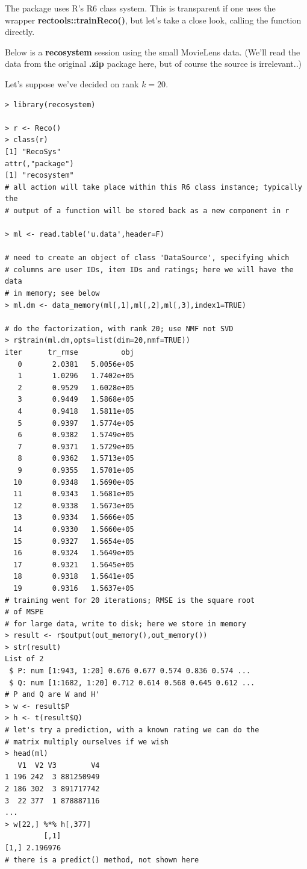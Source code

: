 The package uses R's R6 class system.  This is transparent if one uses
the wrapper \textbf{rectools::trainReco()}, but let's take a close look,
calling the function directly.


Below is a \textbf{recosystem} session using the small MovieLens data.
(We'll read the data from the original \textbf{.zip} package here, but
of course the source is irrelevant..)

Let's suppose we've decided on rank $k = 20$. 

\begin{lstlisting}
> library(recosystem)

> r <- Reco()
> class(r)
[1] "RecoSys"
attr(,"package")
[1] "recosystem"
# all action will take place within this R6 class instance; typically the 
# output of a function will be stored back as a new component in r

> ml <- read.table('u.data',header=F)

# need to create an object of class 'DataSource', specifying which
# columns are user IDs, item IDs and ratings; here we will have the data
# in memory; see below
> ml.dm <- data_memory(ml[,1],ml[,2],ml[,3],index1=TRUE)

# do the factorization, with rank 20; use NMF not SVD
> r$train(ml.dm,opts=list(dim=20,nmf=TRUE))
iter      tr_rmse          obj
   0       2.0381   5.0056e+05
   1       1.0296   1.7402e+05
   2       0.9529   1.6028e+05
   3       0.9449   1.5868e+05
   4       0.9418   1.5811e+05
   5       0.9397   1.5774e+05
   6       0.9382   1.5749e+05
   7       0.9371   1.5729e+05
   8       0.9362   1.5713e+05
   9       0.9355   1.5701e+05
  10       0.9348   1.5690e+05
  11       0.9343   1.5681e+05
  12       0.9338   1.5673e+05
  13       0.9334   1.5666e+05
  14       0.9330   1.5660e+05
  15       0.9327   1.5654e+05
  16       0.9324   1.5649e+05
  17       0.9321   1.5645e+05
  18       0.9318   1.5641e+05
  19       0.9316   1.5637e+05
# training went for 20 iterations; RMSE is the square root
# of MSPE
# for large data, write to disk; here we store in memory
> result <- r$output(out_memory(),out_memory())
> str(result)
List of 2
 $ P: num [1:943, 1:20] 0.676 0.677 0.574 0.836 0.574 ...
 $ Q: num [1:1682, 1:20] 0.712 0.614 0.568 0.645 0.612 ...
# P and Q are W and H'
> w <- result$P
> h <- t(result$Q)
# let's try a prediction, with a known rating we can do the
# matrix multiply ourselves if we wish
> head(ml)
   V1  V2 V3        V4
1 196 242  3 881250949
2 186 302  3 891717742
3  22 377  1 878887116
...
> w[22,] %*% h[,377]
         [,1]
[1,] 2.196976
# there is a predict() method, not shown here
\end{lstlisting}

